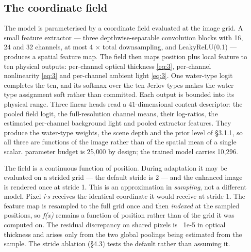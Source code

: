 \documentclass[journal]{IEEEtran}
\begin{document}
\subsection{The coordinate field}
The model is parameterised by a coordinate field evaluated at the image grid. A small feature extractor --- three depthwise-separable convolution blocks with 16, 24 and 32 channels, at most 4 $\times$ total downsampling, and LeakyReLU(0.1) --- produces a spatial feature map. The field then maps position plus local feature to ten physical outputs: per-channel optical thickness \eqref{eq:3}, per-channel nonlinearity \eqref{eq:3} and per-channel ambient light \eqref{eq:3}. One water-type logit completes the ten, and its softmax over the ten Jerlov types makes the water-type assignment soft rather than committed. Each output is bounded into its physical range. Three linear heads read a 41-dimensional content descriptor: the pooled field logit, the full-resolution channel means, their log-ratios, the estimated per-channel background light and pooled extractor features. They produce the water-type weights, the scene depth and the prior level of \S{}3.1.1, so all three are functions of the image rather than of the spatial mean of a single scalar. parameter budget is 25,000 by design; the trained model carries 10,296.

The field is a continuous function of position. During adaptation it may be evaluated on a strided grid --- the default stride is 2 --- and the enhanced image is rendered once at stride 1. This is an approximation in \emph{sampling}, not a different model. Pixel \emph{i$\cdot$s} receives the identical coordinate it would receive at stride 1. The feature map is resampled to the full grid once and then \emph{indexed} at the sampled positions, so \emph{f(x)} remains a function of position rather than of the grid it was computed on. The residual discrepancy on shared pixels is ~1e-5 in optical thickness and arises only from the two global poolings being estimated from the sample. The stride ablation (\S{}4.3) tests the default rather than assuming it.
\end{document}
